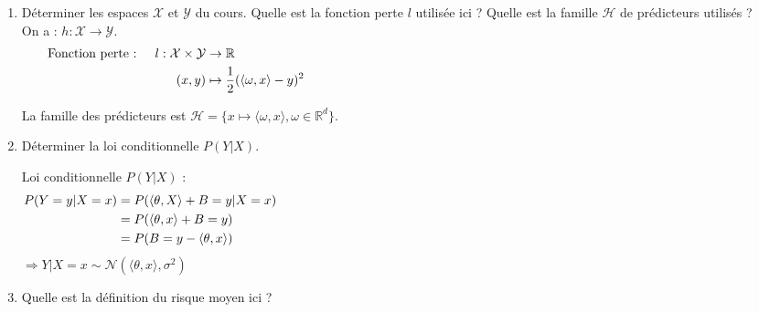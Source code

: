 \documentclass[12pt,a4paper]{article}
\begin{document}
\begin{enumerate}
    \color{black}
    \item Déterminer les espaces $\mathcal{X}$ et $\mathcal{Y}$ du cours.
    Quelle est la fonction perte $l$ utilisée ici ?
    Quelle est la famille $\mathcal{H}$ de prédicteurs utilisés ?\\

    \color{blue}
    On a : $h : \mathcal{X} \rightarrow \mathcal{Y}$.
    \begin{align*}
        \text{Fonction perte : } \quad l : \mathcal{X} \times \mathcal{Y} &\rightarrow \mathbb{R} \hspace{14.5cm}\\
        (x, y) &\mapsto \frac{1}{2} (\langle \omega, x \rangle - y)^2
    \end{align*}

    La famille des prédicteurs est $\mathcal{H} = \{x \mapsto \langle \omega, x \rangle, \omega \in \mathbb{R}^d\}$.\\
    

    \color{black}
    \item Déterminer la loi conditionnelle $P(Y | X)$.

    \color{blue}
    Loi conditionnelle $P(Y | X)$ :
    \begin{align*}
        P(Y = y | X = x) &= P(\langle \theta, X \rangle + B = y | X = x) \hspace{14.5cm}\\
        &= P(\langle \theta, x \rangle + B = y) \\
        &= P(B = y - \langle \theta, x \rangle)
    \end{align*}
    $\Rightarrow Y | X = x \sim \mathcal{N}(\langle \theta, x \rangle, \sigma^2)$\\


    \color{black}
    \item Quelle est la définition du risque moyen ici ?
    

\end{enumerate}
\end{document}

